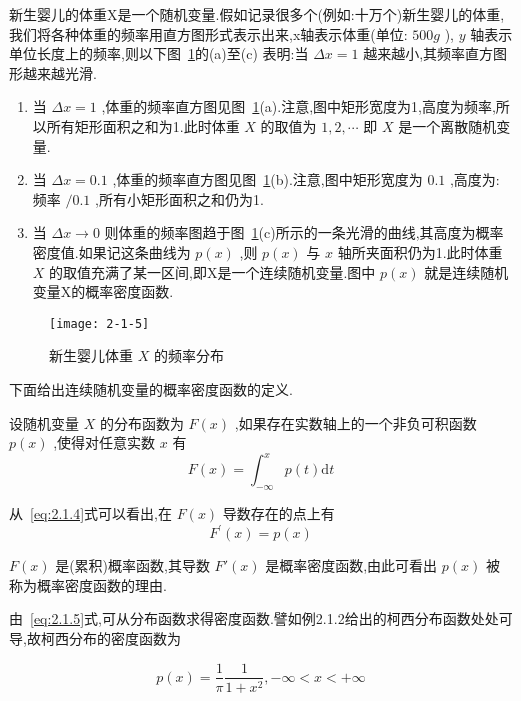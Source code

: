 \begin{example}
	新生婴儿的体重X是一个随机变量.假如记录很多个(例如:十万个)新生婴儿的体重,我们将各种体重的频率用直方图形式表示出来,x轴表示体重(单位: $ 500g $ ), $ y $ 轴表示单位长度上的频率,则以下图~\ref{fig:2-1-5}的(a)至(c)
	表明:当 $ \Delta x=1 $ 越来越小,其频率直方图形越来越光滑.
	
	\begin{enumerate}
		\item 当 $ \Delta x=1 $ ,体重的频率直方图见图~\ref{fig:2-1-5}(a).注意,图中矩形宽度为1,高度为频率,所以所有矩形面积之和为1.此时体重 $ X $ 的取值为 $ 1,2, \cdots $ 即 $ X $ 是一个离散随机变量.
		\item 当 $ \Delta x=0.1 $ ,体重的频率直方图见图~\ref{fig:2-1-5}(b).注意,图中矩形宽度为
		 $ 0.1 $ ,高度为:频率 $ /0.1 $ ,所有小矩形面积之和仍为1.
		\item 当 $ \Delta x \rightarrow 0 $ 则体重的频率图趋于图~\ref{fig:2-1-5}(c)所示的一条光滑的曲线,其高度为概率密度值.如果记这条曲线为 $ p(x) $ ,则 $ p(x) $ 与 $ x $ 轴所夹面积仍为1.此时体重 $ X $ 的取值充满了某一区间,即X是一个连续随机变量.图中 $ p(x) $ 就是连续随机变量X的概率密度函数.
	\end{enumerate}
	
\end{example}

\begin{figure}
	\centering
	\texttt{[image: 2-1-5]}
	\caption{新生婴儿体重 $ X $ 的频率分布}
	\label{fig:2-1-5}
\end{figure}

下面给出连续随机变量的概率密度函数的定义.

\begin{definition}{}{}
	设随机变量 $ X $ 的分布函数为 $ F(x) $ ,如果存在实数轴上的一个非负可积函数 $ p(x) $ ,使得对任意实数 $ x $ 有
	\begin{equation} 
	F(x)=\int_{-\infty}^{x} p(t) \mathrm{d} t \label{eq:2.1.4}
	\end{equation}
	
	从~\ref{eq:2.1.4}式可以看出,在 $ F(x) $ 导数存在的点上有
	\begin{equation} 
	F^{\prime}(x)=p(x) \label{eq:2.1.5}
	\end{equation}
	
	 $ F(x) $ 是(累积)概率函数,其导数 $ F'(x) $ 是概率密度函数,由此可看出 $ p(x) $ 被称为概率密度函数的理由.
	
	由~\ref{eq:2.1.5}式,可从分布函数求得密度函数.譬如例2.1.2给出的柯西分布函数处处可导,故柯西分布的密度函数为
	
	\[ 
	p(x)=\frac{1}{\pi} \frac{1}{1+x^{2}},-\infty<x<+\infty
	\]
\end{definition}


